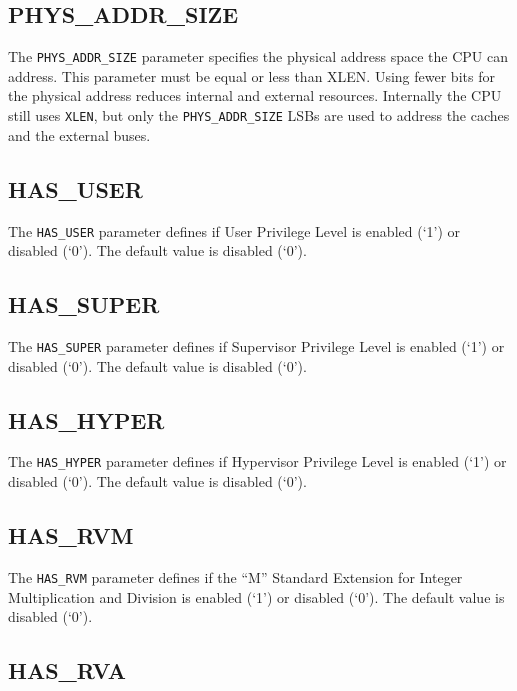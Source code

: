 \subsection{PHYS\_ADDR\_SIZE}\label{phys_addr_size}

The \texttt{PHYS\_ADDR\_SIZE} parameter specifies the physical address space the
CPU can address. This parameter must be equal or less than XLEN. Using fewer
bits for the physical address reduces internal and external resources.
Internally the CPU still uses \texttt{XLEN}, but only the
\texttt{PHYS\_ADDR\_SIZE} LSBs are used to address the caches and the external
buses.

\subsection{HAS\_USER}\label{has_user}

The \texttt{HAS\_USER} parameter defines if User Privilege Level is enabled
(`1') or disabled (`0'). The default value is disabled (`0').

\subsection{HAS\_SUPER}\label{has_super}

The \texttt{HAS\_SUPER} parameter defines if Supervisor Privilege Level is
enabled (`1') or disabled (`0'). The default value is disabled (`0').

\subsection{HAS\_HYPER}\label{has_hyper}

The \texttt{HAS\_HYPER} parameter defines if Hypervisor Privilege Level is
enabled (`1') or disabled (`0'). The default value is disabled (`0').

\subsection{HAS\_RVM}\label{has_rvm}

The \texttt{HAS\_RVM} parameter defines if the ``M'' Standard Extension for
Integer Multiplication and Division is enabled (`1') or disabled (`0').
The default value is disabled (`0').

\subsection{HAS\_RVA}\label{HAS_RVA}

